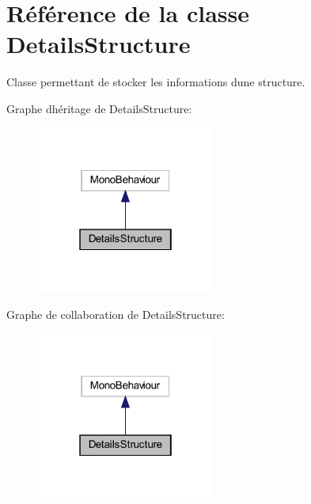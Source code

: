 \hypertarget{class_details_structure}{}\section{Référence de la classe Details\+Structure}
\label{class_details_structure}


Classe permettant de stocker les informations d\textquotesingle{}une structure.  




Graphe d\textquotesingle{}héritage de Details\+Structure\+:\nopagebreak
\begin{figure}[H]
\begin{center}
\leavevmode
\includegraphics[width=166pt]{class_details_structure__inherit__graph}
\end{center}
\end{figure}


Graphe de collaboration de Details\+Structure\+:\nopagebreak
\begin{figure}[H]
\begin{center}
\leavevmode
\includegraphics[width=166pt]{class_details_structure__coll__graph}
\end{center}
\end{figure}
